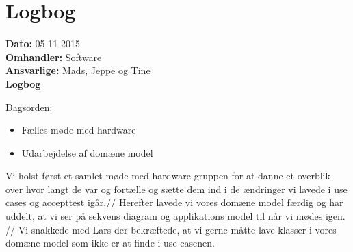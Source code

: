 \section{Logbog}

\textbf{Dato:} 05-11-2015 \\
\textbf{Omhandler:} Software \\
\textbf{Ansvarlige:} Mads, Jeppe og Tine \\
\textbf{Logbog}

Dagsorden:
\begin{itemize}
	\item Fælles møde med hardware
	\item Udarbejdelse af domæne model 
\end{itemize}

Vi holst først et samlet møde med hardware gruppen for at danne et overblik over hvor langt de var og fortælle og sætte dem ind i de ændringer vi lavede i use cases og accepttest igår.//
Herefter lavede vi vores domæne model færdig og har uddelt, at vi ser på sekvens diagram og applikations model til når vi mødes igen. //
Vi snakkede med Lars der bekræftede, at vi gerne måtte lave klasser i vores domæne model som ikke er at finde i use casenen. 
   
